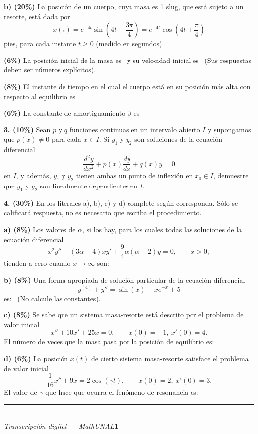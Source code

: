 \documentclass[11pt]{article}
\newcommand{\rp}{\underline{\hspace{3cm}}}
\begin{document}
\noindent\textbf{b) (20\%)} La posición de un cuerpo, cuya masa es 1 slug, que está sujeto a un resorte, está dada por
\[
x(t)=e^{-4t}\sin\!\left(4t+\frac{3\pi}{4}\right)=e^{-4t}\cos\!\left(4t+\frac{\pi}{4}\right)
\]
pies, para cada instante $t\geq 0$ (medido en segundos).
\begin{opciones}
\item \textbf{(6\%)} La posición inicial de la masa es \rp\ y su velocidad inicial es \rp\ (Sus respuestas deben ser números explícitos).
\item \textbf{(8\%)} El instante de tiempo en el cual el cuerpo está en su posición más alta con respecto al equilibrio es \rp
\item \textbf{(6\%)} La constante de amortiguamiento $\beta$ es \rp
\end{opciones}

\newpage

\noindent\textbf{3. (10\%)} Sean $p$ y $q$ funciones continuas en un intervalo abierto $I$ y supongamos que $p(x)\neq 0$ para cada $x\in I$. Si $y_1$ y $y_2$ son soluciones de la ecuación diferencial
\[
\frac{d^2y}{dx^2}+p(x)\frac{dy}{dx}+q(x)y=0
\]
en $I$, y además, $y_1$ y $y_2$ tienen ambas un punto de inflexión en $x_0\in I$, demuestre que $y_1$ y $y_2$ son linealmente dependientes en $I$.

\vspace{6cm}

\noindent\textbf{4. (30\%)} En los literales a), b), c) y d) complete según corresponda. Sólo se calificará respuesta, no es necesario que escriba el procedimiento.

\vspace{0.25cm}
\noindent\textbf{a) (8\%)} Los valores de $\alpha$, si los hay, para los cuales todas las soluciones de la ecuación diferencial
\[
x^2y''-(3\alpha-4)xy'+\frac{9}{4}\alpha(\alpha-2)y=0, \qquad x>0,
\]
tienden a cero cuando $x\to\infty$ son: \rp

\vspace{0.3cm}
\noindent\textbf{b) (8\%)} Una forma apropiada de solución particular de la ecuación diferencial
\[
y^{(4)}+y''=\sin(x)-xe^{-x}+5
\]
es: \rp\ (No calcule las constantes).

\vspace{0.3cm}
\noindent\textbf{c) (8\%)} Se sabe que un sistema masa-resorte está descrito por el problema de valor inicial
\[
x''+10x'+25x=0, \qquad x(0)=-1,\ x'(0)=4.
\]
El número de veces que la masa pasa por la posición de equilibrio es: \rp

\vspace{0.3cm}
\noindent\textbf{d) (6\%)} La posición $x(t)$ de cierto sistema masa-resorte satisface el problema de valor inicial
\[
\frac{1}{16}x''+9x=2\cos(\gamma t), \qquad x(0)=2,\ x'(0)=3.
\]
El valor de $\gamma$ que hace que ocurra el fenómeno de resonancia es: \rp

\vfill
\rule{\linewidth}{0.4pt}\\[1pt]
{\scriptsize\textit{Transcripción digital --- MathUNAL}\hfill\textcolor{unalblue}{\textbf{1}}}
\end{document}
